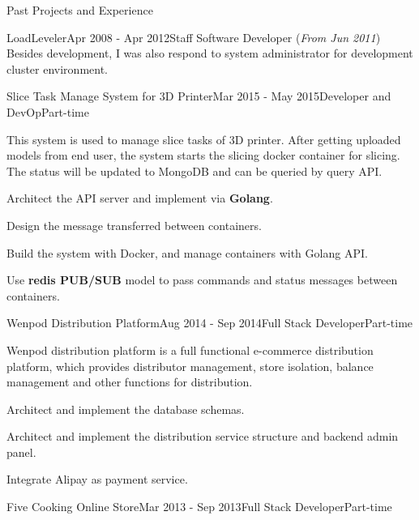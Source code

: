 \documentclass{resume} %
\begin{document}
\begin{rSection}{Past Projects and Experience}
\begin{rSubsection}{LoadLeveler}{Apr 2008 - Apr 2012}{Staff Software Developer (\textit{From Jun 2011})}{}
Besides development, I was also respond to system administrator for development cluster environment.
\end{rSubsection}
\vspace{1.8em}



\begin{rSubsection}{Slice Task Manage System for 3D Printer}{Mar 2015 - May 2015}{Developer and DevOp}{Part-time}

This system is used to manage slice tasks of 3D printer. After getting uploaded models from end user, the system starts the slicing docker container for slicing. The status will be updated to MongoDB and can be queried by query API.

\begin{rSubsectionList}
\item Architect the API server and implement via { \bf Golang}.
\item Design the message transferred between containers.
\item Build the system with Docker, and manage containers with Golang API.
\item Use { \bf redis PUB/SUB } model to pass commands and status messages between containers.
\end{rSubsectionList}
\end{rSubsection}



\begin{rSubsection}{Wenpod Distribution Platform}{Aug 2014 - Sep 2014}{Full Stack Developer}{Part-time}

Wenpod distribution platform is a full functional e-commerce distribution platform, which provides distributor management, store isolation, balance management and other functions for distribution.

\begin{rSubsectionList}
\item Architect and implement the database schemas.
\item Architect and implement the distribution service structure and backend admin panel.
\item Integrate Alipay as payment service.
\end{rSubsectionList}
\end{rSubsection}



\begin{rSubsection}{Five Cooking Online Store}{Mar 2013 - Sep 2013}{Full Stack Developer}{Part-time}


\end{rSubsection}
\end{rSection}
\end{document}
